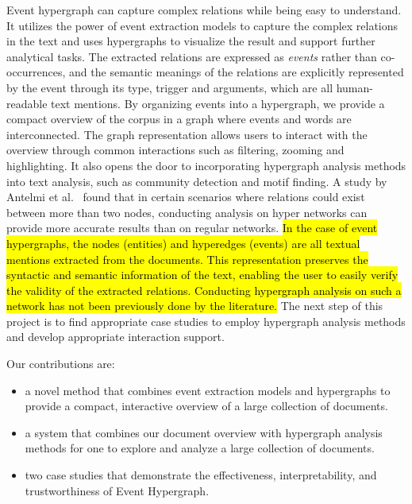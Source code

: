 Event hypergraph can capture complex relations while being easy to understand.
It utilizes the power of event extraction models to capture the complex relations in the text and uses hypergraphs to visualize the result and support further analytical tasks.
The extracted relations are expressed as \textit{events} rather than co-occurrences,
and the semantic meanings of the relations are explicitly represented by the event through its type, trigger and arguments, which are all human-readable text mentions.
By organizing events into a hypergraph, we provide a compact overview of the corpus in a graph where events and words are interconnected. 
The graph representation allows users to interact with the overview through common interactions such as filtering, zooming and highlighting.
It also opens the door to incorporating hypergraph analysis methods into text analysis, such as community detection and motif finding.
A study by Antelmi et al.~\cite{antelmi2020analyzing} found that in certain scenarios where relations could exist between more than two nodes, conducting analysis on hyper networks can provide more accurate results than on regular networks.
\hl{In the case of event hypergraphs,
the nodes (entities) and hyperedges (events) are all textual mentions extracted from the documents.
This representation preserves the syntactic and semantic information of the text, enabling the user to easily verify the validity of the extracted relations.
Conducting hypergraph analysis on such a network has not been previously done by the literature.
}
The next step of this project is to find appropriate case studies to employ hypergraph analysis methods and develop appropriate interaction support. 

Our contributions are:
\begin{itemize}
    \item a novel method that combines event extraction models and hypergraphs to provide a compact, interactive overview of a large collection of documents.
    \item a system that combines our document overview with hypergraph analysis methods for one to explore and analyze a large collection of documents.
    \item two case studies that demonstrate the effectiveness, interpretability, and trustworthiness of Event Hypergraph.
\end{itemize}

